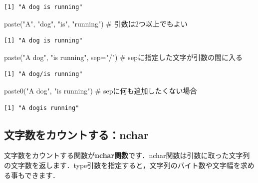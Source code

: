 \documentclass[
  letterpaper,
  DIV=11,
  numbers=noendperiod]{scrreprt}
\newenvironment{Shaded}{\begin{snugshade}}{\end{snugshade}}
\newcommand{\AttributeTok}[1]{\textcolor[rgb]{0.40,0.45,0.13}{#1}}
\newcommand{\CommentTok}[1]{\textcolor[rgb]{0.37,0.37,0.37}{#1}}
\newcommand{\FunctionTok}[1]{\textcolor[rgb]{0.28,0.35,0.67}{#1}}
\newcommand{\NormalTok}[1]{\textcolor[rgb]{0.00,0.23,0.31}{#1}}
\newcommand{\StringTok}[1]{\textcolor[rgb]{0.13,0.47,0.30}{#1}}
\begin{document}
\begin{verbatim}
[1] "A dog is running"
\end{verbatim}

\begin{Shaded}
\begin{Highlighting}[]
\FunctionTok{paste}\NormalTok{(}\StringTok{"A"}\NormalTok{, }\StringTok{"dog"}\NormalTok{, }\StringTok{"is"}\NormalTok{, }\StringTok{"running"}\NormalTok{) }\CommentTok{\# 引数は2つ以上でもよい}
\end{Highlighting}
\end{Shaded}

\begin{verbatim}
[1] "A dog is running"
\end{verbatim}

\begin{Shaded}
\begin{Highlighting}[]
\FunctionTok{paste}\NormalTok{(}\StringTok{"A dog"}\NormalTok{, }\StringTok{"is running"}\NormalTok{, }\AttributeTok{sep=}\StringTok{"/"}\NormalTok{) }\CommentTok{\# sepに指定した文字が引数の間に入る}
\end{Highlighting}
\end{Shaded}

\begin{verbatim}
[1] "A dog/is running"
\end{verbatim}

\begin{Shaded}
\begin{Highlighting}[]
\FunctionTok{paste0}\NormalTok{(}\StringTok{"A dog"}\NormalTok{, }\StringTok{"is running"}\NormalTok{) }\CommentTok{\# sepに何も追加したくない場合}
\end{Highlighting}
\end{Shaded}

\begin{verbatim}
[1] "A dogis running"
\end{verbatim}

\hypertarget{ux6587ux5b57ux6570ux3092ux30abux30a6ux30f3ux30c8ux3059ux308bnchar}{%
\subsection{文字数をカウントする：nchar}\label{ux6587ux5b57ux6570ux3092ux30abux30a6ux30f3ux30c8ux3059ux308bnchar}}

文字数をカウントする関数が\textbf{nchar関数}です．nchar関数は引数に取った文字列の文字数を返します．type引数を指定すると，文字列のバイト数や文字幅を求める事もできます．
\end{document}
